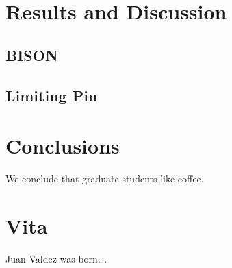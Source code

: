 \documentclass[edeposit,fullpage,12pt]{uiucthesis2009}
\begin{document}
\chapter{Results and Discussion}

\section{BISON}

\section{Limiting Pin}

\chapter{Conclusions}

We conclude that graduate students like coffee.

\backmatter



\chapter{Vita}

Juan Valdez was born\ldots.
\end{document}
